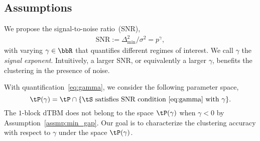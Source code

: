 \documentclass[lettersize,onecolumn,journal]{IEEEtran}
\theoremstyle{definition}
\theoremstyle{definition}
\begin{document}
\subsection{Assumptions} \label{sec:prelim}

We propose the signal-to-noise ratio~(SNR),
\begin{align}\label{eq:gamma}
  \text{SNR}:= \Delta^2_{\min}/\sigma^2 = p^{\gamma}, 
\end{align}
with varying $\gamma \in \bbR$ that quantifies different regimes of interest. We call $\gamma$ the \emph{signal exponent}. Intuitively, a larger SNR, or equivalently a larger $\gamma$, benefits the clustering in the presence of noise. 

With quantification~\eqref{eq:gamma}, we consider the following parameter space,
\begin{equation}\label{eq:gammafamily}
    \tP(\gamma) = \tP\cap\{\tS \text{ satisfies SNR condition~\eqref{eq:gamma} with $\gamma$} \}.
\end{equation}
The $1$-block dTBM does not belong to the space $\tP(\gamma)$ when $\gamma < 0$ by Assumption~\ref{assmp:min_gap}. Our goal is to characterize the clustering accuracy with respect to $\gamma$ under the space $\tP(\gamma)$.
\end{document}
